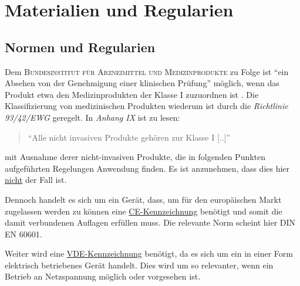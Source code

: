 \chapter{Materialien und Regularien}
	\section{Normen und Regularien}
		Dem \textsc{Bundesinstitut für Arzneimittel und Medizinprodukte} zu Folge ist \enquote{ein Absehen von der Genehmigung einer klinischen Prüfung} \cite{genehmigungspflicht.BfArM}
		möglich, wenn das Produkt etwa den Medizinprodukten der Klasse I zuzuordnen ist \cite{MPG}. Die Klassifizierung von medizinischen
		Produkten wiederum ist durch die \textit{Richtlinie 93/42/EWG} geregelt. In \textit{Anhang IX} ist zu lesen:
		\begin{quote}
			\enquote{Alle nicht invasiven Produkte gehören zur Klasse I [..]} \cite{directive.93-2-EC.medizinprodukte.2007}
		\end{quote}
		mit Ausnahme derer nicht-invasiven Produkte, die in folgenden Punkten aufgeführten Regelungen Anwendung finden.
		Es ist anzunehmen, dass dies hier \underline{nicht} der Fall ist.\par\medskip
	
		Dennoch handelt es sich um ein Gerät, dass, um für den europäischen Markt zugelassen werden zu können eine \underline{CE-Kennzeichnung}
		benötigt und somit die damit verbundenen Auflagen erfüllen muss. Die relevante Norm scheint hier \textsc{DIN EN 60601}.\par
		Weiter wird eine \underline{VDE-Kennzeichnung} benötigt, da es sich um ein in einer Form elektrisch betriebenes Gerät handelt.
		Dies wird um so relevanter, wenn ein Betrieb an Netzspannung möglich oder vorgesehen ist.

